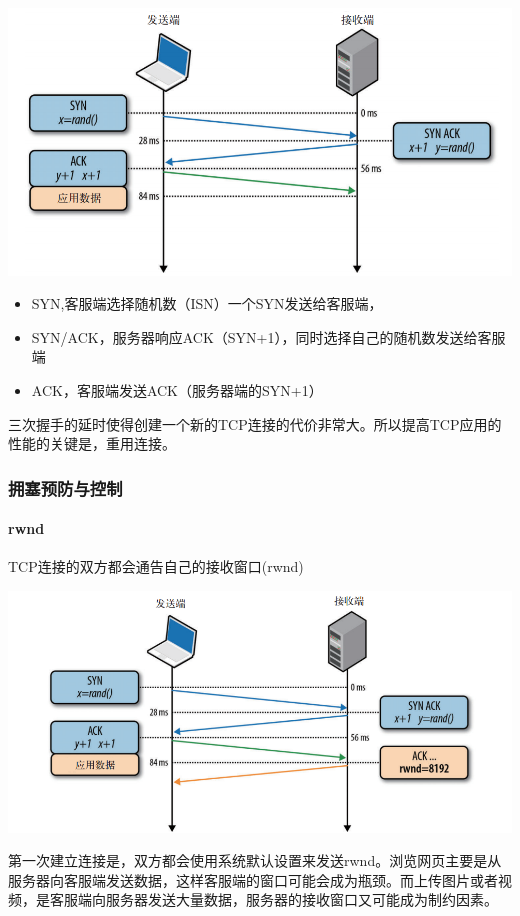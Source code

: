 \includegraphics[scale=1]{web/resources/TCP-3-hand-shake.png}

\begin{itemize}
\item SYN,客服端选择随机数（ISN）一个SYN发送给客服端，
\item SYN/ACK，服务器响应ACK（SYN+1），同时选择自己的随机数发送给客服端
\item ACK，客服端发送ACK（服务器端的SYN+1）
\end{itemize}

三次握手的延时使得创建一个新的TCP连接的代价非常大。所以提高TCP应用的性能的关键是，重用连接。

\subsubsection{拥塞预防与控制}

\paragraph{rwnd}TCP连接的双方都会通告自己的接收窗口(rwnd)

\includegraphics[scale=1]{web/resources/TCP-rwnd.png}

第一次建立连接是，双方都会使用系统默认设置来发送rwnd。浏览网页主要是从服务器向客服端发送数据，这样客服端的窗口可能会成为瓶颈。而上传图片或者视频，是客服端向服务器发送大量数据，服务器的接收窗口又可能成为制约因素。

